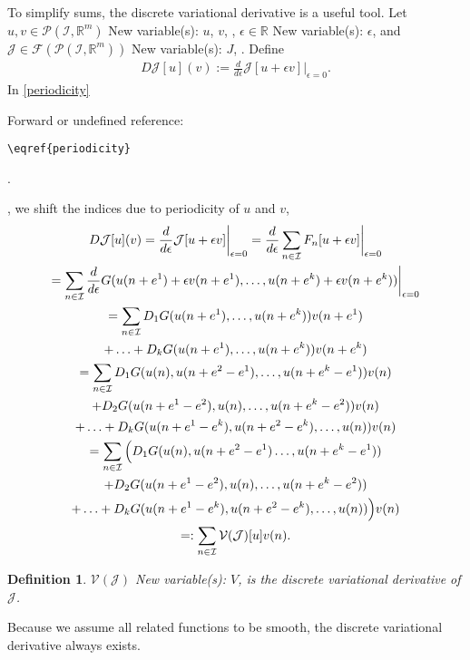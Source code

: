 \documentclass[sigconf,twocolumn]{acmart}
\newcommand{\1}{{\chi}}
\numberwithin{equation}{section}
\theoremstyle{thmlemcorr}
\numberwithin{theorem}{section}
\theoremstyle{thmlemcorr*}
\theoremstyle{defi}
\newtheorem{definition}[theorem]{Definition}
\theoremstyle{remexample}
\theoremstyle{ass}
\begin{document}
To simplify sums, the discrete variational derivative is a useful tool.
Let \(u,v\in\mathcal{P}({\mathcal{I}},{\mathbb{R}}^m)\)
{\color{blue} New variable(s): \(u\), \(v\),  }
, \(\epsilon 
	\in{\mathbb{R}}\)
{\color{blue} New variable(s): \(\epsilon\),  }
 and \(\mathcal{J}\in\mathcal{F}(\mathcal{P}({\mathcal{I}},{\mathbb{R}}^m))\)
{\color{blue} New variable(s): \(J\),  }
. Define
	\begin{gather*}
		D\mathcal{J}[u](v):=\frac{d}{d\epsilon}\mathcal{J}[u+\epsilon v]\bigg|_{\epsilon=0}.
	\end{gather*}
	In \eqref{periodicity}
 {\color{red} Forward or undefined reference: \begin{verbatim}\eqref{periodicity}\end{verbatim}.}
, we shift the indices due to periodicity of \(u\) and \(v\),
	\begin{gather}
	\notag	D\mathcal{J}[u](v)=\frac{d}{d\epsilon}\mathcal{J}[u+\epsilon v]\bigg|_{\epsilon=0}=\frac{d}{d\epsilon}\sum_{n\in{\mathcal{I}}}F_n[u+\epsilon v]\bigg|_{\epsilon=0}\\
	\notag	=\sum_{n\in{\mathcal{I}}}\frac{d}{d\epsilon}G(u(n+e^1)+\epsilon v(n+e^1),\ldots,u(n+e^k)+\epsilon v(n+e^k))\bigg|_{\epsilon=0}\\
	\notag	=\sum_{n\in{\mathcal{I}}}D_1G(u(n+e^1),\ldots,u(n+e^k))v(n+e^1)\\
	\notag	+\ldots+D_kG(u(n+e^1),\ldots,u(n+e^k))v(n+e^k)\\
	\label{periodicity}	=\sum_{n\in{\mathcal{I}}}D_1G(u(n),u(n+e^2-e^1),\ldots,u(n+e^k-e^1))v(n)\\
	\notag	+D_2G(u(n+e^1-e^2),u(n),\ldots,u(n+e^k-e^2))v(n)\\
	\notag	+\ldots+D_kG(u(n+e^1-e^k),u(n+e^2-e^k),\ldots,u(n))v(n)\\
	\notag	=\sum_{n\in{\mathcal{I}}}\Big(D_1G(u(n),u(n+e^2-e^1)\ldots,u(n+e^k-e^1))\\
	\notag	+D_2G(u(n+e^1-e^2),u(n),\ldots,u(n+e^k-e^2))\\
	\notag	+\ldots+D_kG(u(n+e^1-e^k),u(n+e^2-e^k),\ldots,u(n))\Big)v(n)\\
	\notag	=:\sum_{n\in{\mathcal{I}}}\mathcal{V}(\mathcal{J})[u]v(n).	
	\end{gather}
\begin{definition}
\(\mathcal{V}(\mathcal{J})\)
{\color{blue} New variable(s): \(V\),  }
 is the discrete variational derivative of \(\mathcal{J}\).
\end{definition}
Because we assume all related functions to be smooth, the discrete variational derivative always exists.
\end{document}
